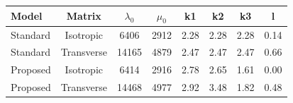 \documentclass[a4paper,fleqn]{DC_ArtStyle}
\begin{document}
	\begin{table}
		\begin{tabular}{l|c|c|c|c|c|c|c}
			Model & Matrix & $\lambda_0$ & $\mu_0$ & k1 & k2 & k3 & l \\
			\hline
			Standard & Isotropic & 6406 & 2912 & 2.28 & 2.28 & 2.28 & 0.14 \\
			Standard & Transverse & 14165 & 4879 & 2.47 & 2.47 & 2.47 & 0.66 \\
			Proposed & Isotropic & 6414 & 2916 & 2.78 & 2.65 & 1.61 & 0.00 \\
			Proposed & Transverse & 14468 & 4977 & 2.92 & 3.48 & 1.82 & 0.48 \\
			\hline
		\end{tabular}
	\end{table}
\end{document}
